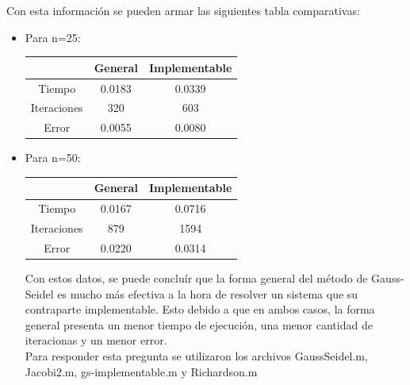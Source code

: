 \documentclass{udpreport}
\begin{document}
\begin{enumerate}
\begin{enumerate}
 	        Con esta información se pueden armar las siguientes tabla comparativas:
 	        \begin{itemize}
 	        	\item Para n=25: \begin{table}[H]
 	        			\centering
 	        			\begin{tabular}{|c|c|c|}
 	        				\hline 
							 & General & Implementable \\
							 \hline
							 Tiempo & 0.0183 & 0.0339 \\
							 \hline
							 Iteraciones & 320 & 603\\
							 \hline
							 Error & 0.0055 & 0.0080\\
							\hline
 	        			\end{tabular}
 	        		\end{table}
 	        		\item Para n=50: \begin{table}[H]
 	        			\centering
 	        			\begin{tabular}{|c|c|c|}
 	        				\hline 
							 & General & Implementable \\
							 \hline
							 Tiempo & 0.0167 & 0.0716 \\
							 \hline
							 Iteraciones & 879 & 1594 \\
							 \hline
							 Error & 0.0220 & 0.0314\\
							\hline
 	        			\end{tabular}
 	        		\end{table}
 	        		Con estos datos, se puede concluír que la forma general del método de Gauss-Seidel es mucho más efectiva a la hora de resolver un sistema que su contraparte implementable. Esto debido a que en ambos casos, la forma general presenta un menor tiempo de ejecución, una menor cantidad de iteracionas y un menor error.
 	        		\\
 	        		Para responder esta pregunta se utilizaron los archivos GaussSeidel.m, Jacobi2.m, gs-implementable.m y Richardson.m
 	        \end{itemize}
 	 \end{enumerate}
 \end{enumerate}
 

\newpage
\end{document}
